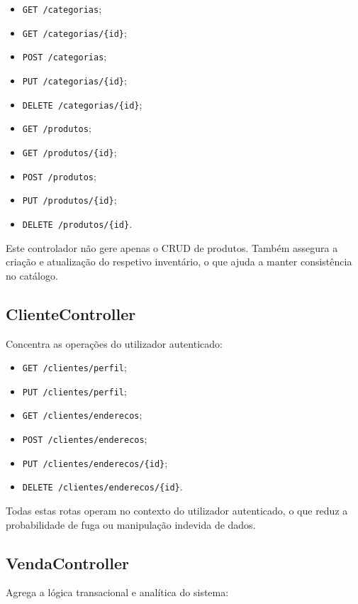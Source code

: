 \documentclass[10pt,a4paper]{report}
\begin{document}
\begin{itemize}
    \item \texttt{GET /categorias};
    \item \texttt{GET /categorias/\{id\}};
    \item \texttt{POST /categorias};
    \item \texttt{PUT /categorias/\{id\}};
    \item \texttt{DELETE /categorias/\{id\}};
    \item \texttt{GET /produtos};
    \item \texttt{GET /produtos/\{id\}};
    \item \texttt{POST /produtos};
    \item \texttt{PUT /produtos/\{id\}};
    \item \texttt{DELETE /produtos/\{id\}}.
\end{itemize}

Este controlador não gere apenas o \ac{CRUD} de produtos. Também assegura a criação e atualização do respetivo inventário, o que ajuda a manter consistência no catálogo.

\subsection{ClienteController}

Concentra as operações do utilizador autenticado:

\begin{itemize}
    \item \texttt{GET /clientes/perfil};
    \item \texttt{PUT /clientes/perfil};
    \item \texttt{GET /clientes/enderecos};
    \item \texttt{POST /clientes/enderecos};
    \item \texttt{PUT /clientes/enderecos/\{id\}};
    \item \texttt{DELETE /clientes/enderecos/\{id\}}.
\end{itemize}

Todas estas rotas operam no contexto do utilizador autenticado, o que reduz a probabilidade de fuga ou manipulação indevida de dados.

\subsection{VendaController}

Agrega a lógica transacional e analítica do sistema:
\end{document}
